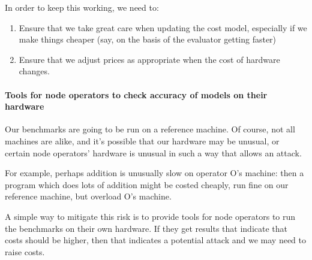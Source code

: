 In order to keep this working, we need to:
\begin{enumerate}
\item Ensure that we take great care when updating the cost model, especially if we make things cheaper (say, on the basis of the evaluator getting faster)
\item Ensure that we adjust prices as appropriate when the cost of hardware changes.
\end{enumerate}

\paragraph{Tools for node operators to check accuracy of models on their hardware}
Our benchmarks are going to be run on a reference machine.
Of course, not all machines are alike, and it's possible that our hardware may be unusual, or certain node operators' hardware is unusual in such a way that allows an attack.

For example, perhaps addition is unusually slow on operator O's machine: then a program which does lots of addition might be costed cheaply, run fine on our reference machine, but overload O's machine.

A simple way to mitigate this risk is to provide tools for node operators to run the benchmarks on their own hardware.
If they get results that indicate that costs should be higher, then that indicates a potential attack and we may need to raise costs.
